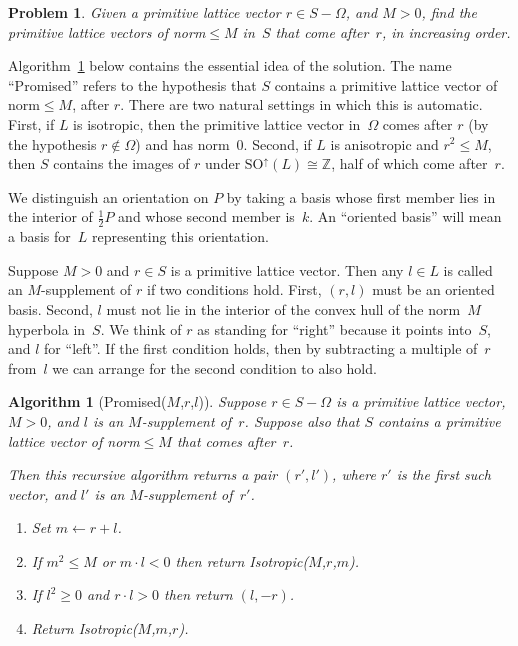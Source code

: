 \documentclass[12pt]{amsart}
\def\SO{\mathrm{SO}}
\def\SOup{\SO^{\uparrow}}
\def\Z{\mathbb{Z}}
\def\SOup{\mathrm{SO}^{\uparrow}}
\let\iso\cong
\def\cong{\equiv}
\numberwithin{theorem}{section}
\numberwithin{equation}{section}
\numberwithin{figure}{section}
\newtheorem{algorithm}[theorem]{Algorithm}
\newtheorem{problem}[theorem]{Problem}
\theoremstyle{remark}
\begin{document}
\begin{problem}
    \label{ProbShortVectorsInOrder}
    Given a primitive lattice vector $r\in S-\Omega$, 
    and $M>0$, find the primitive lattice vectors of
    norm${}\leq M$ in~$S$ that come after~$r$, in increasing order.
\end{problem}

Algorithm~\ref{AlgPromised} below contains the essential idea of the solution.
The name ``{\sf Promised}'' refers to the hypothesis that $S$ contains
a primitive lattice vector of norm${}\leq M$, after $r$.  There are
two natural settings in which this is automatic.  First, if $L$
is isotropic, then the primitive lattice vector in~$\Omega$
comes after $r$ (by the hypothesis $r\notin\Omega$) and has norm~$0$.
Second, if $L$ is anisotropic and $r^2\leq M$, then 
$S$ contains the images of $r$ under $\SOup(L)\iso\Z$, half of
which come after~$r$.

We distinguish an orientation on $P$ by taking a basis whose
first member lies in the interior of $\frac12P$ and whose second
member is~$k$.  An ``oriented basis'' will mean a basis for~$L$
representing this orientation.

Suppose $M>0$ and $r\in S$ is a primitive lattice vector. Then any
$l\in L$ is called an $M$-supplement of $r$ if two conditions
hold.  First, $(r,l)$ must be an oriented basis.  Second, $l$ must not
lie in the interior of the convex hull of the norm~$M$ hyperbola in~$S$.
We think of $r$ as standing for ``right'' because it points into~$S$,
and $l$ for ``left''.  
If the first condition holds, then by subtracting a multiple of~$r$ from~$l$
we can arrange for the second condition to also hold.

\begin{algorithm}[{\sf Promised($M$,$r$,$l$)}]
    \label{AlgPromised}
    Suppose 
    $r\in S-\Omega$ is a primitive lattice vector, $M>0$,
    and $l$ is an $M$-supplement of~$r$.  Suppose also that $S$
    contains a primitive lattice vector of norm${}\leq M$ that
    comes after~$r$.  
    
    Then this recursive algorithm returns a pair $(r',l')$, where $r'$ is the
    first such vector,
    and $l'$ is
    an $M$-supplement of~$r'$.

	\begin{enumerate}
		\item{}
			\label{StepFindMiddle}
			Set $m\leftarrow r+l$.
		\item\relax{\sf[Go right?]}
			\label{StepRight}
			If $m^2\leq M$ or $m\cdot l<0$ then return {\sf Isotropic($M$,$r$,$m$)}.
		\item\relax{\sf[Done?]}
			\label{StepDone}
			If $l^2\geq0$ and $r\cdot l>0$
			then return $(l,-r)$.			
		\item\relax{\sf[Go left]}
			\label{StepLeft}
			Return {\sf Isotropic($M$,$m$,$r$)}.
	\end{enumerate}
\end{algorithm}
\end{document}
